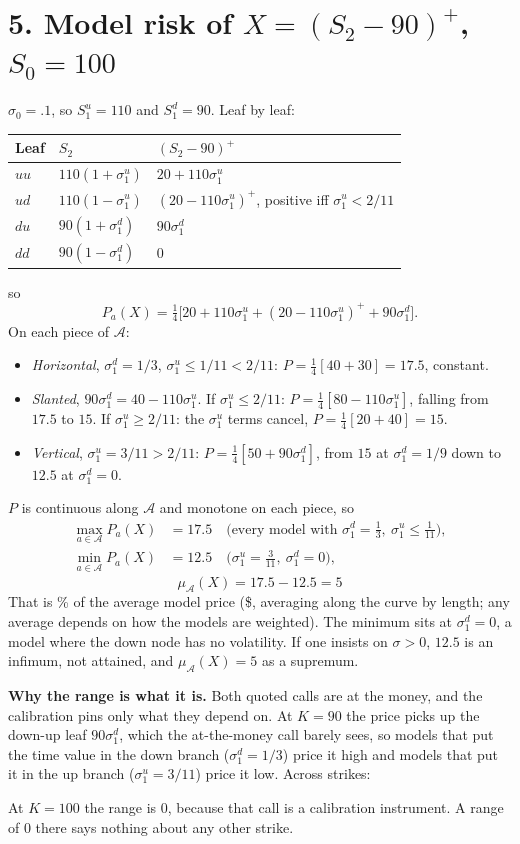 \documentclass[12pt]{article}
\newcommand{\1}{\mathbf{1}}
\theoremstyle{remark}
\newcommand{\su}{\sigma_1^u}
\newcommand{\sd}{\sigma_1^d}
\begin{document}
\section*{5. Model risk of $X=(S_2-90)^+$, $S_0=100$}
$\sigma_0=.1$, so $S_1^u=110$ and $S_1^d=90$. Leaf by leaf:
\begin{center}\small
\begin{tabular}{lll}\toprule
Leaf & $S_2$ & $(S_2-90)^+$\\\midrule
$uu$ & $110(1+\su)$ & $20+110\su$\\
$ud$ & $110(1-\su)$ & $(20-110\su)^+$, positive iff $\su<2/11$\\
$du$ & $90(1+\sd)$ & $90\sd$\\
$dd$ & $90(1-\sd)$ & $0$\\\bottomrule
\end{tabular}
\end{center}
so
\[
P_a(X)=\tfrac14\bigl[20+110\su+(20-110\su)^++90\sd\bigr].
\]
On each piece of $\mathcal A$:
\begin{itemize}[leftmargin=*]
\item \emph{Horizontal}, $\sd=1/3$, $\su\le1/11<2/11$: $P=\tfrac14[40+30]=17.5$, constant.
\item \emph{Slanted}, $90\sd=40-110\su$. If $\su\le2/11$: $P=\tfrac14[80-110\su]$, falling from $17.5$ to
$15$. If $\su\ge2/11$: the $\su$ terms cancel, $P=\tfrac14[20+40]=15$.
\item \emph{Vertical}, $\su=3/11>2/11$: $P=\tfrac14[50+90\sd]$, from $15$ at $\sd=1/9$ down to $12.5$ at $\sd=0$.
\end{itemize}
$P$ is continuous along $\mathcal A$ and monotone on each piece, so
\begin{align*}
\max_{a\in\mathcal A}P_a(X)&=17.5\quad\bigl(\text{every model with }\sd=\tfrac13,\ \su\le\tfrac1{11}\bigr),\\
\min_{a\in\mathcal A}P_a(X)&=12.5\quad\bigl(\su=\tfrac3{11},\ \sd=0\bigr),
\end{align*}
\[
\boxed{\ \mu_{\mathcal A}(X)=17.5-12.5=5\ }
\]
That is \RangeOverAvg\% of the average model price (\$\AvgArc, averaging along the curve by length; any
average depends on how the models are weighted). The minimum sits at $\sd=0$, a model where the
down node has no volatility. If one insists on $\sigma>0$, $12.5$ is an infimum, not attained, and
$\mu_{\mathcal A}(X)=5$ as a supremum.

\textbf{Why the range is what it is.} Both quoted calls are at the money, and the calibration pins
only what they depend on. At $K=90$ the price picks up the down-up leaf $90\sd$, which the
at-the-money call barely sees, so models that put the time value in the down branch ($\sd=1/3$)
price it high and models that put it in the up branch ($\su=3/11$) price it low. Across strikes:
\begin{center}\small

\end{center}
At $K=100$ the range is $0$, because that call is a calibration instrument. A range of $0$ there says
nothing about any other strike.
\end{document}
